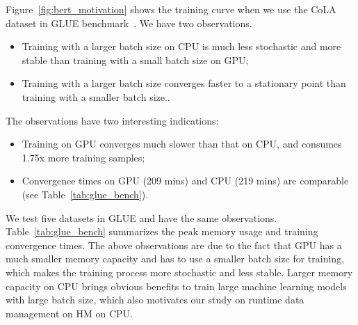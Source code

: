 \textcolor{check}{
Figure~\ref{fig:bert_motivation} shows the training curve when we use the CoLA dataset in GLUE benchmark~\cite{wang-etal-2018-glue}. We have two observations.}

\begin{itemize} %
    \item \textcolor{check}{Training with a larger batch size on CPU is much less stochastic and more stable than training with a small batch size on GPU;}
    \item \textcolor{check}{Training with a larger batch size converges faster to a stationary point than training with a smaller batch size.}. 
\end{itemize}

\textcolor{check}{
The observations have two interesting indications: }
\begin{itemize} %
    \item \textcolor{check}{Training on GPU converges much slower than that on CPU, and consumes 1.75x more training samples;}
    \item \textcolor{check}{Convergence times on GPU (209 mins) and CPU (219 mins) are comparable (see Table~\ref{tab:glue_bench})}. 
\end{itemize}

\textcolor{check}{
We test five datasets in GLUE and have the same observations. Table~\ref{tab:glue_bench} summarizes the peak memory usage and training convergence times. The above observations are due to the fact that GPU has a much smaller memory capacity and has to use a smaller batch size for training, which makes the training process more stochastic and less stable. Larger memory capacity on CPU brings obvious benefits to train large machine learning models with large batch size, which also motivates our study on runtime data management on HM on CPU}.


